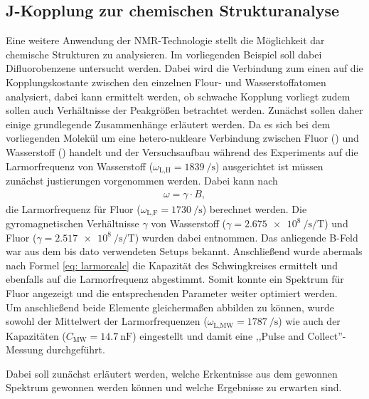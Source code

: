 \subsection{J-Kopplung zur chemischen Strukturanalyse}
Eine weitere Anwendung der NMR-Technologie stellt die Möglichkeit dar chemische Strukturen zu analysieren.
Im vorliegenden Beispiel soll dabei Difluorobenzene untersucht werden.
Dabei wird die Verbindung zum einen auf die Kopplungskostante zwischen den einzelnen Flour- und Wasserstoffatomen analysiert, dabei kann ermittelt werden, ob schwache Kopplung vorliegt zudem sollen auch Verhältnisse der Peakgrößen betrachtet werden.
Zunächst sollen daher einige grundlegende Zusammenhänge erläutert werden.
Da es sich bei dem vorliegenden Molekül um eine hetero-nukleare Verbindung zwischen Fluor () und Wasserstoff () handelt und der Versuchsaufbau während des Experiments auf die Larmorfrequenz von Wasserstoff ($\omega_{\text{L,H}} = \SI{1839}{\per \second}$) ausgerichtet ist müssen zunächst justierungen vorgenommen werden.
Dabei kann nach
\begin{align}
    \omega = \gamma \cdot B , \label{eq: LarmorB}    
\end{align}
die Larmorfrequenz für Fluor ($\omega_{\text{L,F}} = \SI{1730}{\per \second}$) berechnet werden. 
Die gyromagnetischen Verhältnisse $\gamma$ von Wasserstoff ($\gamma = \SI{2.675 e8}{\per \second \per \tesla}$) und Fluor ($\gamma = \SI{2.517 e8}{\per \second \per \tesla}$) wurden dabei \cite{Schmidt} entnommen. 
Das anliegende B-Feld war aus dem bis dato verwendeten Setups bekannt.
Anschließend wurde abermals nach Formel \eqref{eq: larmorcalc} die Kapazität des Schwingkreises ermittelt und ebenfalls auf die Larmorfrequenz abgestimmt.
Somit konnte ein Spektrum für Fluor angezeigt und die entsprechenden Parameter weiter optimiert werden. \cite{Schmidt} \\
Um anschließend beide Elemente gleichermaßen abbilden zu können, wurde sowohl der Mittelwert der Larmorfrequenzen ($\omega_{\text{L,MW}} = \SI{1787}{\per \second}$) wie auch der Kapazitäten ($C_{\text{MW}} = \SI{14.7}{\nano \farad}$) eingestellt und damit eine ,,Pulse and Collect''-Messung durchgeführt.

Dabei soll zunächst erläutert werden, welche Erkentnisse aus dem gewonnen Spektrum gewonnen werden können und welche Ergebnisse zu erwarten sind.


